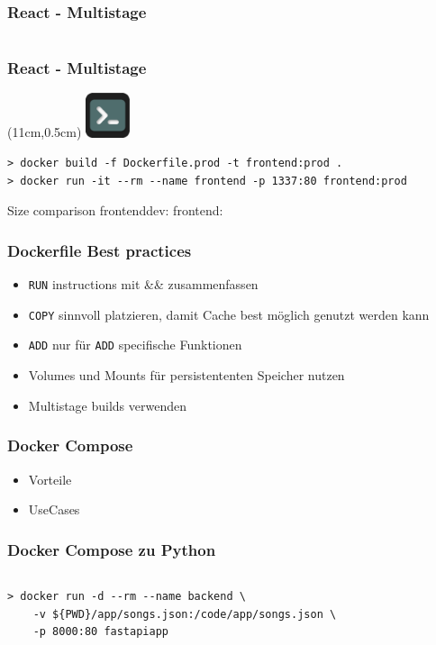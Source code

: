 \documentclass[22pt]{beamer}
\newcommand{\code}[1]{\colorbox{gray!10}{\texttt{#1}}}
\newcommand{\terminal}{
    \begin{textblock*}{1.3cm}(11cm,0.5cm) %
    \includegraphics[width=1.3cm]{Bilder/terminal2.png}
    \end{textblock*}
}
\begin{document}
\begin{frame}[fragile]
    \frametitle{React - Multistage}
    \inputminted[fontsize=\footnotesize, frame=lines]{dockerfile}{../examples/React/Dockerfile.prod}
\end{frame}

\begin{frame}[fragile]
    \frametitle{React - Multistage}
    \terminal
\begin{verbatim}
> docker build -f Dockerfile.prod -t frontend:prod .
> docker run -it --rm --name frontend -p 1337:80 frontend:prod
\end{verbatim}

Size comparison
frontenddev:
frontend:

\end{frame}

\begin{frame}[t]
    \frametitle{Dockerfile Best practices}
    \begin{itemize}
        \item \code{RUN} instructions mit \&\& zusammenfassen
        \item \code{COPY} sinnvoll platzieren, damit Cache best möglich genutzt werden kann
        \item \code{ADD} nur für \code{ADD} specifische Funktionen
        \item Volumes und Mounts für persistententen Speicher nutzen
        \item Multistage builds verwenden
    \end{itemize} 
\end{frame}


\begin{frame}[t]
    \frametitle{Docker Compose}
    \begin{itemize}
        \item Vorteile
        \item UseCases
    \end{itemize} 
\end{frame}

\begin{frame}[fragile]
    \frametitle{Docker Compose zu Python}
    \inputminted[fontsize=\footnotesize, frame=lines]{dockerfile}{../examples/FastAPI/docker-compose.yml}
    \medskip
    \begin{verbatim}
> docker run -d --rm --name backend \
    -v ${PWD}/app/songs.json:/code/app/songs.json \
    -p 8000:80 fastapiapp 
        
    \end{verbatim}
\end{frame}
\end{document}
